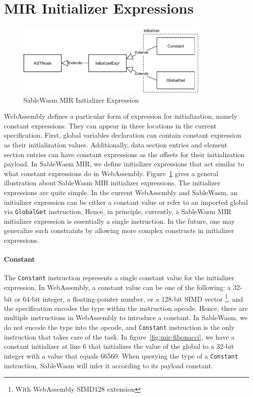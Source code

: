 \section{MIR Initializer Expressions}
\label{section:mir-design-mir-init-expr}

\begin{figure}
  \centering
  \includegraphics[width=0.85\textwidth]{Images/4.MIR/initalizer-expression.pdf}
  \caption{SableWasm MIR Initializer Expression}
  \label{fig:sablewasm-mir-initializer-expression}
\end{figure}

WebAssembly defines a particular form of expression for initialization, namely
constant expressions. They can appear in three locations in the current
specification. First, global variables declaration can contain constant
expression as their initialization values. Additionally, data section entries
and element section entries can have constant expressions as the offsets for
their initialization payload. In SableWasm MIR, we define initializer
expressions that act similar to what constant expressions do in WebAssembly.
Figure~\ref{fig:sablewasm-mir-initializer-expression} gives a general
illustration about SableWasm MIR initializer expressions. The initializer
expressions are quite simple. In the current WebAssembly and SableWasm, an
initializer expression can be either a constant value or refer to an imported
global via \texttt{GlobalGet} instruction. Hence, in principle, currently,
a SableWasm MIR initializer expression is essentially a single instruction. In
the future, one may generalize such constraints by allowing more complex
constructs in initializer expressions.

\paragraph{Constant}
The \texttt{Constant} instruction represents a single constant value for the
initializer expression. In WebAssembly, a constant value can be one of the
following: a 32-bit or 64-bit integer, a floating-pointer number, or a 128-bit
SIMD vector \footnote{With WebAssembly SIMD128 extension}, and the specification
encodes the type within the instruction opcode. Hence, there are multiple
instructions in WebAssembly to introduce a constant. In SableWasm, we do not
encode the type into the opcode, and \texttt{Constant} instruction is the only
instruction that takes care of the task. In figure~\ref{fig:mir-fibonacci}, we
have a constant initializer at line 6 that initializes the value of the global
to a 32-bit integer with a value that equals 66560. When querying the type of a
\texttt{Constant} instruction, SableWasm will infer it according to its payload
constant.

